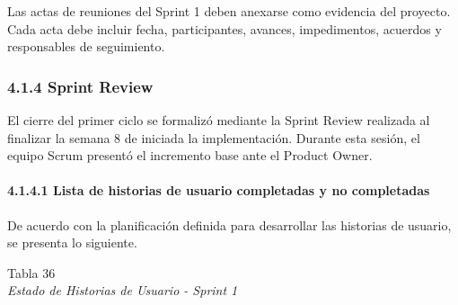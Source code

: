 \documentclass[12pt,a4paper,oneside]{report}
\begin{document}
Las actas de reuniones del Sprint 1 deben anexarse como evidencia del
proyecto. Cada acta debe incluir fecha, participantes, avances,
impedimentos, acuerdos y responsables de seguimiento.

\subsubsection{4.1.4 Sprint Review}\label{sprint-review}

El cierre del primer ciclo se formalizó mediante la Sprint Review
realizada al finalizar la semana 8 de iniciada la implementación.
Durante esta sesión, el equipo Scrum presentó el incremento base ante el
Product Owner.

\paragraph{4.1.4.1 Lista de historias de usuario completadas y no
completadas}\label{lista-de-historias-de-usuario-completadas-y-no-completadas}

De acuerdo con la planificación definida para desarrollar las historias
de usuario, se presenta lo siguiente.

\label{_Toc231672291}{}Tabla 36\\
\emph{Estado de Historias de Usuario - Sprint 1}
\end{document}
